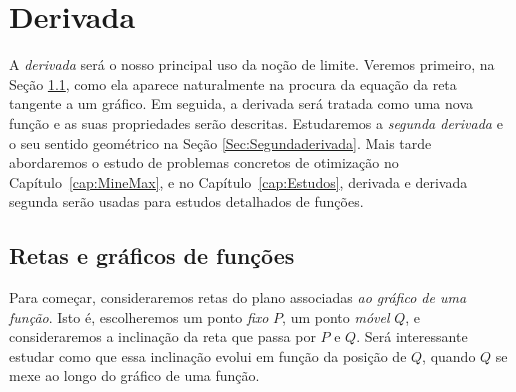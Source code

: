 

\chapter{Derivada}\label{Cap:Derivacao}
  
\ifdefined\updateans
\fi

A \emph{derivada} será o nosso principal uso da noção de limite.
Veremos primeiro, na Seção \ref{Sec:RetasGraf}, como ela aparece 
naturalmente na
procura da equação da reta tangente a um gráfico. 
Em seguida, a derivada será
tratada como uma nova função e as suas propriedades serão descritas.
Estudaremos a \emph{segunda derivada} e o seu sentido geométrico na Seção 
\ref{Sec:Segundaderivada}.
Mais tarde abordaremos o estudo de problemas concretos de otimização
no Capítulo~\ref{cap:MineMax}, e no Capítulo~\ref{cap:Estudos},
derivada e derivada segunda serão
usadas para estudos detalhados de funções.

\section{Retas e gráficos de funções}\label{Sec:RetasGraf}

Para começar, consideraremos retas do plano
associadas \emph{ao gráfico de uma função}.
Isto é, escolheremos um ponto \emph{fixo} $P$, um ponto \emph{móvel} $Q$, e 
consideraremos a inclinação da reta que passa por $P$ e $Q$.
Será interessante estudar como que essa inclinação evolui em função da 
posição de $Q$, quando $Q$ se mexe ao longo do gráfico de uma função.

